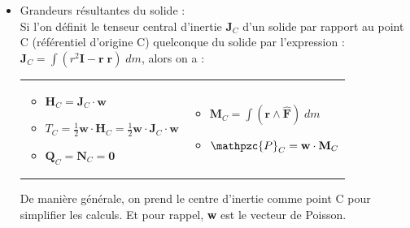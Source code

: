 \documentclass[a4paper]{article}
\begin{document}
\begin{itemize}
\item Grandeurs résultantes du solide : \\
Si l'on définit le tenseur central d'inertie $\textbf{J}_C $ d'un solide par rapport au point C (référentiel d'origine C) quelconque du solide par l'expression : $\displaystyle \textbf{J}_C = \int ( r^2 \textbf{I} - \textbf{r} \; \textbf{r} ) \; d m $, alors on a : \\
\begin{tabular}{p{}p{}}
\begin{itemize}
\item $\displaystyle \textbf{H}_C = \textbf{J}_C \cdot \textbf{w} $
\item $\displaystyle T_C = \frac{1}{2} \textbf{w} \cdot \textbf{H}_C = \frac{1}{2} \textbf{w} \cdot \textbf{J}_C \cdot \textbf{w} $
\item $\displaystyle \textbf{Q}_C = \textbf{N}_C = \textbf{0} $
\end{itemize} & 
\begin{itemize}
\item $\displaystyle \textbf{M}_C = \int (\textbf{r} \wedge \hat{\textbf{F}}) \; d m $
\item $\displaystyle \mathpzc{P}_C = \textbf{w} \cdot \textbf{M}_C $
\end{itemize} \end{tabular}
De manière générale, on prend le centre d'inertie comme point C pour simplifier les calculs. Et pour rappel, \textbf{w} est le vecteur de Poisson.






\end{itemize}
\end{document}
